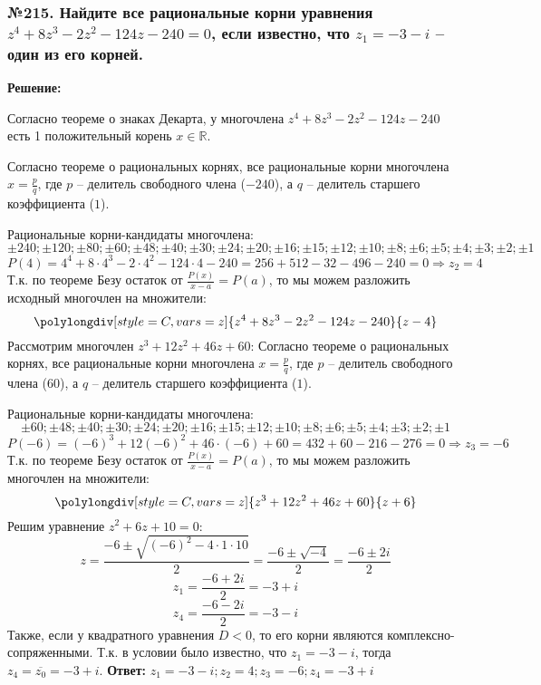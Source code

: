 \documentclass[a4paper]{article}
\begin{document}
\subsubsection*{№215. Найдите все рациональные корни уравнения $z^4+8z^3-2z^2-124z-240=0$, если известно, что $z_1=-3-i$ -- один из его корней.}
\textbf{Решение:} \par 
Согласно теореме о знаках Декарта, у многочлена $z^4+8z^3-2z^2-124z-240$ есть 1 положительный корень $x \in \mathbb{R}$. \par
Согласно теореме о рациональных корнях, все рациональные корни многочлена $x=\frac{p}{q}$, где $p$ -- делитель свободного члена ($-240$), а $q$ -- делитель старшего коэффициента ($1$). \par
Рациональные корни-кандидаты многочлена: 
\[\pm240; \pm120; \pm80; \pm60; \pm48; \pm40; \pm30; \pm24; \pm20; \pm16; \pm15; \pm12; \pm10; \pm8; \pm6; \pm5; \pm4; \pm3; \pm2; \pm1\]
\[P(4)=4^4+8\cdot4^3-2\cdot4^2-124\cdot4-240=256+512-32-496-240=0 \Rightarrow z_2=4\]
Т.к. по теореме Безу остаток от $\frac{P(x)}{x-a}=P(a)$, то мы можем разложить исходный многочлен на множители: 
\[\polylongdiv[style=C, vars=z]{z^4+8z^3-2z^2-124z-240}{z-4}\]
Рассмотрим многочлен $z^3+12z^2+46z+60$: \newline
Согласно теореме о рациональных корнях, все рациональные корни многочлена $x=\frac{p}{q}$, где $p$ -- делитель свободного члена ($60$), а $q$ -- делитель старшего коэффициента ($1$). \par
Рациональные корни-кандидаты многочлена: 
\[\pm60; \pm48; \pm40; \pm30; \pm24; \pm20; \pm16; \pm15; \pm12; \pm10; \pm8; \pm6; \pm5; \pm4; \pm3; \pm2; \pm1\]
\[P(-6)=(-6)^3+12(-6)^2+46\cdot(-6)+60=432+60-216-276=0 \Rightarrow z_3=-6\]
Т.к. по теореме Безу остаток от $\frac{P(x)}{x-a}=P(a)$, то мы можем разложить многочлен на множители: 
\[\polylongdiv[style=C, vars=z]{z^3+12z^2+46z+60}{z+6}\]
Решим уравнение $z^2+6z+10=0$:
\[z=\frac{-6\pm\sqrt{(-6)^2-4\cdot1\cdot10}}{2}=\frac{-6\pm\sqrt{-4}}{2}=\frac{-6\pm2i}{2}\]
\[z_1=\frac{-6+2i}{2}=-3+i\]
\[z_4=\frac{-6-2i}{2}=-3-i\]
Также, если у квадратного уравнения $D<0$, то его корни являются комплексно-сопряженными. Т.к. в условии было известно, что $z_1=-3-i$, тогда $z_4=\overline{z_0}=-3+i$. \newline
\textbf{Ответ:} $\displaystyle z_1=-3-i; z_2=4; z_3=-6; z_4=-3+i$
\end{document}
